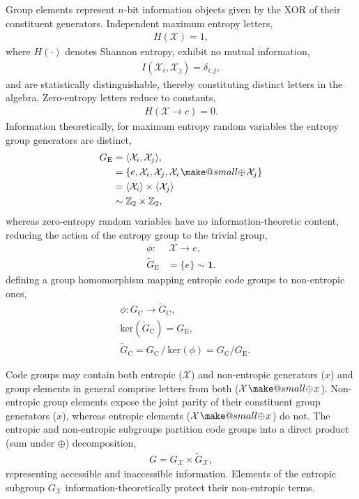 \documentclass[twocolumn, aps, amsmath, amssymb, nofootinbib, superscriptaddress, longbibliography, doublefloatfix, table-of-contents, eqsecnum, rmp]{revtex4-2}
\makeatletter
\newcommand{\soplus}{{{\hspace{1pt}}{\mathbin{\mathpalette\make@small{\mathbin\oplus}}}}{\hspace{1pt}}}
\newcommand{\make@small}[2]{%
  \vcenter{\hbox{%
    \scalebox{0.6}{$\m@th#1#2$}%
  }}%
}
\makeatother
\begin{document}
Group elements represent $n$-bit information objects given by the XOR of their constituent generators. Independent maximum entropy letters,
\begin{align}
	H(\mathcal{X}) = 1,
\end{align}
where $H(\cdot)$ denotes Shannon entropy, exhibit no mutual information,
\begin{align}
	I(\mathcal{X}_i,\mathcal{X}_j) = \delta_{i,j},
\end{align}
and are statistically distinguishable, thereby constituting distinct letters in the algebra. Zero-entropy letters reduce to constants,
\begin{align}
	H(\mathcal{X} \to c) = 0.
\end{align}
Information theoretically, for maximum entropy random variables the entropy group generators are distinct,
\begin{align}
	G_\mathrm{E} &= \langle \mathcal{X}_i,\mathcal{X}_j\rangle,\nonumber\\
	&= \{e,\mathcal{X}_i,\mathcal{X}_j, \mathcal{X}_i\soplus \mathcal{X}_j\} \nonumber\\
	&= \langle \mathcal{X}_i\rangle \times \langle \mathcal{X}_j\rangle \nonumber\\
	&\sim \mathbb{Z}_2 \times \mathbb{Z}_2,
\end{align}
whereas zero-entropy random variables have no information-theoretic content, reducing the action of the entropy group to the trivial group,
\begin{align}
	\phi:&\, \mathcal{X} \to e,\nonumber\\
	{\tilde{G}}_\mathrm{E} &= \{e\} \sim \mathbf{1}.
\end{align}
defining a group homomorphism mapping entropic code groups to non-entropic ones,
\begin{align}
	&\phi: G_\mathrm{C} \to {\tilde G}_\mathrm{C},\nonumber\\
	&\mathrm{ker}({\tilde G}_\mathrm{C}) = G_\mathrm{E},\nonumber\\
	&{\tilde G}_\mathrm{C} = G_\mathrm{C} \,/\, \mathrm{ker}(\phi) = G_\mathrm{C} / G_\mathrm{E}.
\end{align}

Code groups may contain both entropic ($\mathcal{X}$) and non-entropic generators ($x$) and group elements in general comprise letters from both ($\mathcal{X}\soplus x$). Non-entropic group elements expose the joint parity  of their constituent group generators ($x$), whereas entropic elements ($\mathcal{X}\soplus x$) do not. The entropic and non-entropic subgroups partition code groups into a direct product (sum under $\oplus$) decomposition,
\begin{align}
	G = G_\mathcal{X} \times \tilde{G}_\mathcal{X},
\end{align}
representing accessible and inaccessible information. Elements of the entropic subgroup $G_\mathcal{X}$ information-theoretically protect their non-entropic terms.
\end{document}

